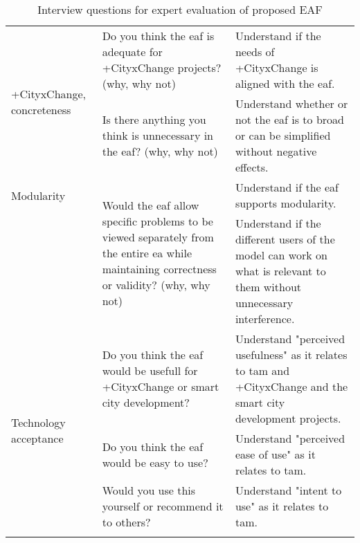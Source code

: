 {\begin{longtable}{|p{2.3cm}|p{4.5cm}|p{5cm}|}
        \hline
        \multirow{2}{2.3cm}{+CityxChange, concreteness} 
            & \multirow{1}{4.5cm}{Do you think the \gls{eaf} is adequate for +CityxChange projects? (why, why not)} & Understand if the needs of +CityxChange is aligned with the \gls{eaf}. \\ \cline{2-3}
            & \multirow{1}{4.5cm}{Is there anything you think is unnecessary in the \gls{eaf}? (why, why not)} & Understand whether or not the \gls{eaf} is to broad or can be simplified without negative effects. \\
        \hline
        \multirow{1}{2.3cm}{Modularity} 
            & \multirow{2}{4.5cm}{Would the \gls{eaf} allow specific problems to be viewed separately from the entire \gls{ea} while maintaining correctness or validity? (why, why not) } & Understand if the \gls{eaf} supports modularity. \\ \cline{3-3}
            & & Understand if the different users of the model can work on what is relevant to them without unnecessary interference. \\
        \hline
        \multirow{3}{2.3cm}{Technology acceptance} 
            & \multirow{1}{4.5cm}{Do you think the \gls{eaf} would be usefull for +CityxChange or smart city development?} & Understand "perceived usefulness" as it relates to \gls{tam} and +CityxChange and the smart city development projects. \\ \cline{2-3}
            & \multirow{1}{4.5cm}{Do you think the \gls{eaf} would be easy to use?} & Understand "perceived ease of use" as it relates to \gls{tam}. \\ \cline{2-3}
            & \multirow{1}{4.5cm}{Would you use this yourself or recommend it to others?} & Understand "intent to use" as it relates to \gls{tam}. \\
    \hline
    
    \caption{Interview questions for expert evaluation of proposed EAF}
    \label{tab:4-evaluation-interview}
\end{longtable}}